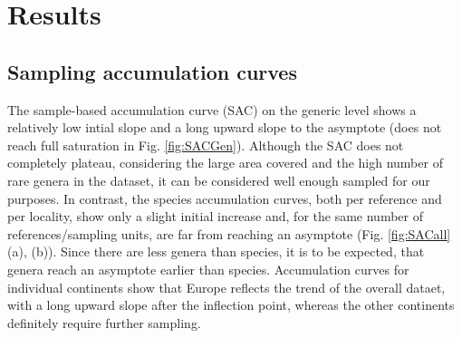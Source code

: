 \section{Results}


\subsection{Sampling accumulation curves}
The sample-based accumulation curve (SAC) on the generic level shows a relatively low intial slope and a long upward slope to the asymptote (does not reach full saturation in Fig. \ref{fig:SACGen}).
Although the SAC does not completely plateau, considering the large area covered and the high number of rare genera in the dataset, it can be considered well enough sampled for our purposes.
In contrast, the species accumulation curves, both per reference and per locality, show only a slight initial increase and, for the same number of references/sampling units, are far from reaching an asymptote (Fig. \ref{fig:SACall} (a), (b)).
 Since there are less genera than species, it is to be expected, that genera reach an asymptote earlier than species.
Accumulation curves for individual continents show that Europe reflects the trend of the overall dataet, with a long upward slope after the inflection point, whereas the other continents definitely require further sampling.


